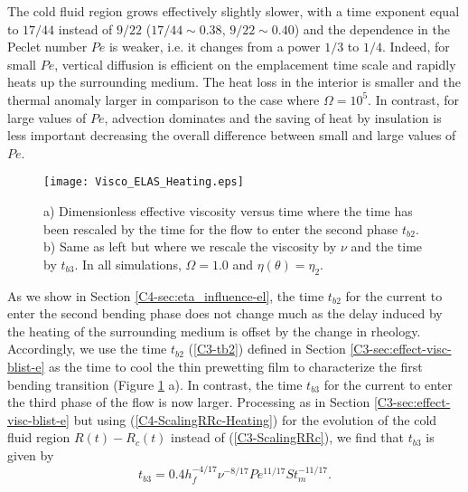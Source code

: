 The cold fluid  region grows effectively slightly slower,  with a time
exponent  equal  to $17/44$  instead  of  $9/22$ ($17/44  \sim  0.38$,
$9/22\sim  0.40$) and  the dependence  in  the Peclet  number $Pe$  is
weaker, i.e.   it changes from  a power  $1/3$ to $1/4$.   Indeed, for
small $Pe$,  vertical diffusion is  efficient on the  emplacement time
scale and  rapidly heats up the  surrounding medium. The heat  loss in
the interior is  smaller and the thermal anomaly  larger in comparison
to the  case where $\Omega= 10^5$.   In contrast, for large  values of
$Pe$, advection dominates and the saving of heat by insulation is less
important decreasing  the overall  difference between small  and large
values of $Pe$.

\begin{figure}[h!]
  \begin{center}
    \graphicspath{ {/Users/thorey/Documents/These/Projet/Refroidissement/Skin_Model/Figure/Figure_Heating/} }
    \texttt{[image: Visco\_ELAS\_Heating.eps]}
    \caption{a)  Dimensionless effective  viscosity versus  time where
      the time has been rescaled by the time for the flow to enter the
      second phase $t_{b2}$. b) Same as  left but where we rescale the
      viscosity by $\nu$ and the time by $t_{b3}$. In all simulations,
      $\Omega=1.0$ and $\eta(\theta)=\eta_2$.}
    \label{C4-Visco_ELAS_Heating}
  \end{center}
\end{figure}

As  we  show  in Section  \ref{C4-sec:eta_influence-el},  the  time
$t_{b2}$ for  the current to enter  the second bending phase  does not
change much  as the delay  induced by  the heating of  the surrounding
medium is offset  by the change in rheology.  Accordingly,  we use the
time      $t_{b2}$     (\ref{C3-tb2})      defined     in      Section
\ref{C3-sec:effect-visc-blist-e}  as   the  time  to  cool   the  thin
prewetting film  to characterize the first  bending transition (Figure
\ref{C4-Visco_ELAS_Heating} a). In contrast, the time $t_{b3}$ for the
current to enter the third phase of the flow is now larger. Processing
as    in    Section   \ref{C3-sec:effect-visc-blist-e}    but    using
(\ref{C4-ScalingRRc-Heating})  for the  evolution  of  the cold  fluid
region $R(t)-R_c(t)$  instead of  (\ref{C3-ScalingRRc}), we  find that
$t_{b3}$ is given by
\begin{equation}
  t_{b3}=0.4h_f^{-4/17}\nu^{-8/17}Pe^{11/17}St_m^{-11/17}.
  \label{C4-tb3}
\end{equation}

